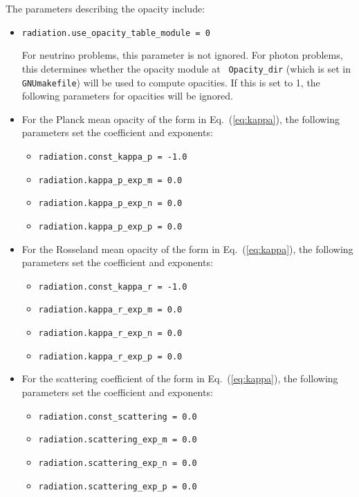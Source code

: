 \documentclass[11pt,letterpaper]{article}
\begin{document}
The parameters describing the opacity include:
\begin{itemize}

\item {\tt radiation.use\_opacity\_table\_module = 0}
  
  For neutrino problems, this parameter is not ignored.  For photon
  problems, this determines whether the opacity module at {\tt
    Opacity\_dir} (which is set in {\tt GNUmakefile}) will be used to
  compute opacities.  If this is set to 1, the following parameters
  for opacities will be ignored.

\item For the Planck mean opacity of the form in Eq.~(\ref{eq:kappa}),
  the following parameters set the coefficient and exponents:
  \begin{itemize}
  \item {\tt radiation.const\_kappa\_p = -1.0}
  \item {\tt radiation.kappa\_p\_exp\_m = 0.0}
  \item {\tt radiation.kappa\_p\_exp\_n = 0.0}
  \item {\tt radiation.kappa\_p\_exp\_p = 0.0}
  \end{itemize}

\item For the Rosseland mean opacity of the form in Eq.~(\ref{eq:kappa}),
  the following parameters set the coefficient and exponents:
  \begin{itemize}
  \item {\tt radiation.const\_kappa\_r = -1.0}
  \item {\tt radiation.kappa\_r\_exp\_m = 0.0}
  \item {\tt radiation.kappa\_r\_exp\_n = 0.0}
  \item {\tt radiation.kappa\_r\_exp\_p = 0.0}
  \end{itemize}
  
\item For the scattering coefficient of the form in Eq.~(\ref{eq:kappa}),
  the following parameters set the coefficient and exponents:
  \begin{itemize}
  \item {\tt radiation.const\_scattering = 0.0}
  \item {\tt radiation.scattering\_exp\_m = 0.0}
  \item {\tt radiation.scattering\_exp\_n = 0.0}
  \item {\tt radiation.scattering\_exp\_p = 0.0}
  \end{itemize}


\end{itemize}
\end{document}
